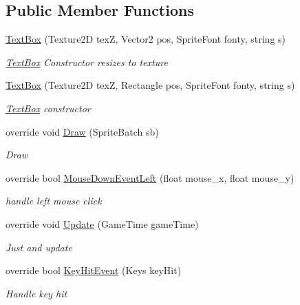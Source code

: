 \subsection*{Public Member Functions}
\begin{DoxyCompactItemize}
\item 
\mbox{\hyperlink{class_r_c___framework_1_1_text_box_a59fb82c062e9d8a5136538040886c888}{Text\+Box}} (Texture2D texZ, Vector2 pos, Sprite\+Font fonty, string s)
\begin{DoxyCompactList}\small\item\em \mbox{\hyperlink{class_r_c___framework_1_1_text_box}{Text\+Box}} Constructor resizes to texture \end{DoxyCompactList}\item 
\mbox{\hyperlink{class_r_c___framework_1_1_text_box_a57589e2cf51832721c30e4bf52c67169}{Text\+Box}} (Texture2D texZ, Rectangle pos, Sprite\+Font fonty, string s)
\begin{DoxyCompactList}\small\item\em \mbox{\hyperlink{class_r_c___framework_1_1_text_box}{Text\+Box}} constructor \end{DoxyCompactList}\item 
override void \mbox{\hyperlink{class_r_c___framework_1_1_text_box_a4a237df7322d0a902b7c5144b0c7bf0d}{Draw}} (Sprite\+Batch sb)
\begin{DoxyCompactList}\small\item\em Draw \end{DoxyCompactList}\item 
override bool \mbox{\hyperlink{class_r_c___framework_1_1_text_box_a73f9a94392ff9bf3639a37a29470fb63}{Mouse\+Down\+Event\+Left}} (float mouse\+\_\+x, float mouse\+\_\+y)
\begin{DoxyCompactList}\small\item\em handle left mouse click \end{DoxyCompactList}\item 
override void \mbox{\hyperlink{class_r_c___framework_1_1_text_box_ad0faeeb8a2ffc1a9fc593e58a80e8376}{Update}} (Game\+Time game\+Time)
\begin{DoxyCompactList}\small\item\em Just and update \end{DoxyCompactList}\item 
override bool \mbox{\hyperlink{class_r_c___framework_1_1_text_box_ae8c28e507b2c91aa042e2a5c2a300598}{Key\+Hit\+Event}} (Keys key\+Hit)
\begin{DoxyCompactList}\small\item\em Handle key hit \end{DoxyCompactList}\end{DoxyCompactItemize}

